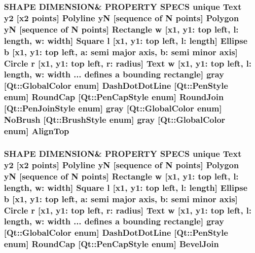 \subsubsection[{\texorpdfstring{Align\+Top}{AlignTop}}]{\setlength{\rightskip}{0pt plus 5cm}S\+H\+A\+PE D\+I\+M\+E\+N\+S\+I\+ON\& P\+R\+O\+P\+E\+R\+TY S\+P\+E\+CS unique {\bf Text} {\bf y2} \mbox{[}{\bf x2} points\mbox{]} {\bf Polyline} yN \mbox{[}sequence of N points\mbox{]} {\bf Polygon} yN \mbox{[}sequence of N points\mbox{]} {\bf Rectangle} w \mbox{[}{\bf x1}, y1\+: top left, l\+: length, w\+: width\mbox{]} {\bf Square} {\bf l} \mbox{[}{\bf x1}, y1\+: top left, l\+: length\mbox{]} {\bf Ellipse} b \mbox{[}{\bf x1}, y1\+: top left, a\+: semi major axis, b\+: semi minor axis\mbox{]} {\bf Circle} r \mbox{[}{\bf x1}, y1\+: top left, r\+: radius\mbox{]} {\bf Text} w \mbox{[}{\bf x1}, y1\+: top left, l\+: length, w\+: width ... defines {\bf a} bounding rectangle\mbox{]} gray \mbox{[}Qt\+::\+Global\+Color enum\mbox{]} Dash\+Dot\+Dot\+Line \mbox{[}Qt\+::\+Pen\+Style enum\mbox{]} Round\+Cap \mbox{[}{\bf Qt\+::\+Pen\+Cap\+Style} enum\mbox{]} Round\+Join \mbox{[}{\bf Qt\+::\+Pen\+Join\+Style} enum\mbox{]} gray \mbox{[}Qt\+::\+Global\+Color enum\mbox{]} No\+Brush \mbox{[}{\bf Qt\+::\+Brush\+Style} enum\mbox{]} gray \mbox{[}Qt\+::\+Global\+Color enum\mbox{]} Align\+Top}\hypertarget{shape__input__file__specs_8txt_aee1cc7fcf53eb2309c193209ca375621}{}\label{shape__input__file__specs_8txt_aee1cc7fcf53eb2309c193209ca375621}
\subsubsection[{\texorpdfstring{Bevel\+Join}{BevelJoin}}]{\setlength{\rightskip}{0pt plus 5cm}S\+H\+A\+PE D\+I\+M\+E\+N\+S\+I\+ON\& P\+R\+O\+P\+E\+R\+TY S\+P\+E\+CS unique {\bf Text} {\bf y2} \mbox{[}{\bf x2} points\mbox{]} {\bf Polyline} yN \mbox{[}sequence of N points\mbox{]} {\bf Polygon} yN \mbox{[}sequence of N points\mbox{]} {\bf Rectangle} w \mbox{[}{\bf x1}, y1\+: top left, l\+: length, w\+: width\mbox{]} {\bf Square} {\bf l} \mbox{[}{\bf x1}, y1\+: top left, l\+: length\mbox{]} {\bf Ellipse} b \mbox{[}{\bf x1}, y1\+: top left, a\+: semi major axis, b\+: semi minor axis\mbox{]} {\bf Circle} r \mbox{[}{\bf x1}, y1\+: top left, r\+: radius\mbox{]} {\bf Text} w \mbox{[}{\bf x1}, y1\+: top left, l\+: length, w\+: width ... defines {\bf a} bounding rectangle\mbox{]} gray \mbox{[}Qt\+::\+Global\+Color enum\mbox{]} Dash\+Dot\+Dot\+Line \mbox{[}Qt\+::\+Pen\+Style enum\mbox{]} Round\+Cap \mbox{[}{\bf Qt\+::\+Pen\+Cap\+Style} enum\mbox{]} Bevel\+Join}\hypertarget{shape__input__file__specs_8txt_a5375660f38f399a9c1c854c3579fdce5}{}\label{shape__input__file__specs_8txt_a5375660f38f399a9c1c854c3579fdce5}
